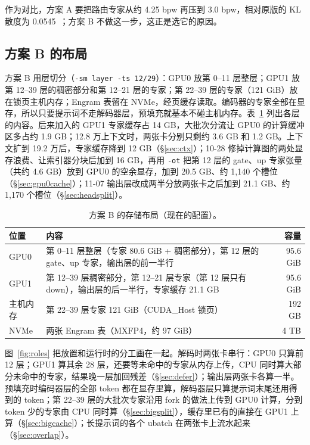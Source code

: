 \documentclass[11pt,a4paper]{article}
\newcommand{\code}[1]{\texttt{#1}}
\begin{document}
作为对比，方案 A 要把路由专家从约 4.25 bpw 再压到 3.0 bpw，相对原版的 KL 散度为 0.0545~\cite{diffbot}；方案 B 不做这一步，这正是选它的原因。

\subsection{方案 B 的布局}

方案 B 用层切分（\code{-sm layer -ts 12/29}）：GPU0 放第 0--11 层整层；GPU1 放第 12--39 层的稠密部分和第 12--21 层的专家；第 22--39 层的专家（121 GiB）放在锁页主机内存；Engram 表留在 NVMe，经页缓存读取。编码器的专家全部在显存，所以只要提示词不走解码器层，预填充就基本不碰主机内存。表~\ref{tab:place} 列出各层的内容。后来加入的 GPU1 专家缓存占 14 GB，大批次分流让 GPU0 的计算缓冲区多占约 1.9 GB；12.8 万上下文时，两张卡分别只剩约 3.6 GB 和 1.2 GB。上下文扩到 19.2 万后，专家缓存降到 12 GB（\S\ref{sec:ctx}）；10-28 修掉计算图的两处显存浪费、让索引器分块后加到 16 GB，再用 \code{-ot} 把第 12 层的 gate、up 专家张量（共约 4.6 GB）放到 GPU0 的空余显存，加到 20.5 GB、约 1,140 个槽位（\S\ref{sec:gpu0cache}）；11-07 输出层改成两半分放两张卡之后加到 21.1 GB、约 1,170 个槽位（\S\ref{sec:headsplit}）。

\begin{table}[h]
  \centering
  \small
  \caption{方案 B 的存储布局（现在的配置）。}
  \label{tab:place}
  \begin{tabularx}{\textwidth}{@{}l X r@{}}
    \toprule
    位置 & 内容 & 容量 \\
    \midrule
    GPU0 & 第 0--11 层整层（专家 80.6 GiB + 稠密部分），第 12 层的 gate、up 专家，输出层的前一半行 & 95.6 GiB \\
    GPU1 & 第 12--39 层稠密部分，第 12--21 层专家（第 12 层只有 down），输出层的后一半行，专家缓存 21.1 GB & 95.6 GiB \\
    主机内存 & 第 22--39 层专家 121 GiB（CUDA\_Host 锁页） & 192 GB \\
    NVMe & 两张 Engram 表（MXFP4，约 97 GiB） & 4 TB \\
    \bottomrule
  \end{tabularx}
\end{table}

图~\ref{fig:roles} 把放置和运行时的分工画在一起。解码时两张卡串行：GPU0 只算前 12 层；GPU1 算其余 28 层，还要等未命中的专家从内存上传，CPU 同时算大部分未命中的专家，结果晚一层加回残差（\S\ref{sec:defer}）；输出层两张卡各算一半。预填充时编码器层的全部 token 都在显存里算，解码器层只算提示词末尾还用得到的 token；第 22--39 层的大批次专家沿用 fork 的做法上传到 GPU0 计算，分到 token 少的专家由 CPU 同时算（\S\ref{sec:bigsplit}），缓存里已有的直接在 GPU1 上算（\S\ref{sec:bigcache}）；长提示词的各个 ubatch 在两张卡上流水起来（\S\ref{sec:overlap}）。
\end{document}
